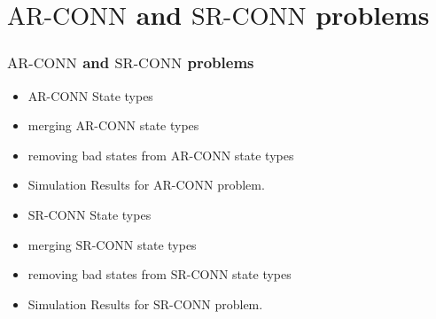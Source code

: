 \documentclass{beamer}
\newcommand{\ARCONN}   { {\mathrm {AR\mbox{-}CONN}} }
\newcommand{\SRCONN}   { {\mathrm {SR\mbox{-}CONN}} }
\begin{document}
\section{$\ARCONN$ and $\SRCONN$ problems}

\begin{frame}
\frametitle{$\ARCONN$ and $\SRCONN$ problems}
\begin{itemize}
\item $\ARCONN$ State types
\item merging $\ARCONN$ state types
\item removing bad states from $\ARCONN$ state types
\item Simulation Results for $\ARCONN$ problem.
\item $\SRCONN$ State types
\item merging $\SRCONN$ state types
\item removing bad states from $\SRCONN$ state types
\item Simulation Results for $\SRCONN$ problem.
\end{itemize}
\end{frame}
\end{document}
